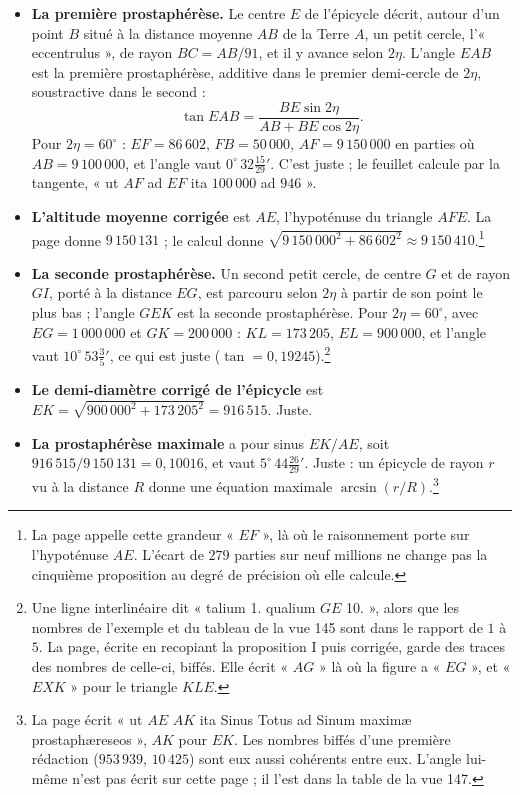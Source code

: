 \documentclass[11pt,a4paper]{article}
\begin{document}
\begin{itemize}
  \item \textbf{La première prostaphérèse.} Le centre $E$ de l'épicycle décrit,
    autour d'un point $B$ situé à la distance moyenne $AB$ de la Terre $A$, un
    petit cercle, l'« eccentrulus », de rayon $BC = AB/91$, et il y avance selon
    $2\eta$. L'angle $EAB$ est la première prostaphérèse, additive dans le premier
    demi-cercle de $2\eta$, soustractive dans le second :
    \[ \tan EAB = \frac{BE\sin 2\eta}{AB + BE\cos 2\eta} . \]
    Pour $2\eta = 60^\circ$ : $EF = 86\,602$, $FB = 50\,000$, $AF = 9\,150\,000$ en
    parties où $AB = 9\,100\,000$, et l'angle vaut $0^\circ\,32\tfrac{15}{29}'$. C'est
    juste ; le feuillet calcule par la tangente, « ut $AF$ ad $EF$ ita $100\,000$ ad
    $946$ ».
  \item \textbf{L'altitude moyenne corrigée} est $AE$, l'hypoténuse du triangle
    $AFE$. La page donne $9\,150\,131$ ; le calcul donne
    $\sqrt{9\,150\,000^2 + 86\,602^2} \approx 9\,150\,410$.\footnote{La page appelle cette
    grandeur « $EF$ », là où le raisonnement porte sur l'hypoténuse $AE$. L'écart de
    $279$ parties sur neuf millions ne change pas la cinquième proposition au
    degré de précision où elle calcule.}
  \item \textbf{La seconde prostaphérèse.} Un second petit cercle, de centre $G$ et
    de rayon $GI$, porté à la distance $EG$, est parcouru selon $2\eta$ à partir de
    son point le plus bas ; l'angle $GEK$ est la seconde prostaphérèse. Pour
    $2\eta = 60^\circ$, avec $EG = 1\,000\,000$ et $GK = 200\,000$ : $KL = 173\,205$,
    $EL = 900\,000$, et l'angle vaut $10^\circ\,53\tfrac35'$, ce qui est juste
    ($\tan = 0{,}19245$).\footnote{Une ligne interlinéaire dit « talium 1. qualium $GE$
    10. », alors que les nombres de l'exemple et du tableau de la vue 145 sont dans
    le rapport de $1$ à $5$. La page, écrite en recopiant la proposition I puis
    corrigée, garde des traces des nombres de celle-ci, biffés. Elle écrit
    « $AG$ » là où la figure a « $EG$ », et « $EXK$ » pour le triangle $KLE$.}
  \item \textbf{Le demi-diamètre corrigé de l'épicycle} est
    $EK = \sqrt{900\,000^2 + 173\,205^2} = 916\,515$. Juste.
  \item \textbf{La prostaphérèse maximale} a pour sinus $EK/AE$, soit
    $916\,515/9\,150\,131 = 0{,}10016$, et vaut $5^\circ\,44\tfrac{26}{29}'$. Juste :
    un épicycle de rayon $r$ vu à la distance $R$ donne une équation maximale
    $\arcsin(r/R)$.\footnote{La page écrit « ut $AE$ $AK$ ita Sinus Totus ad Sinum
    maximæ prostaphæreseos », $AK$ pour $EK$. Les nombres biffés d'une première
    rédaction ($953\,939$, $10\,425$) sont eux aussi cohérents entre eux. L'angle
    lui-même n'est pas écrit sur cette page ; il l'est dans la table de la vue 147.}
\end{itemize}
\end{document}
